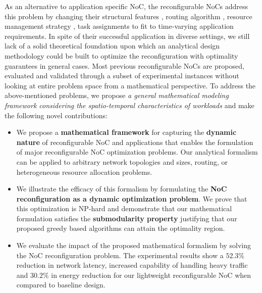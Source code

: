 As an alternative to application specific NoC, the reconfigurable NoCs address this problem by changing their structural features \cite{chen2013smart}\cite{jackson2010skip}, routing algorithm \cite{qian2015fsnoc}, resource management strategy \cite{lee2013adaptive}\cite{kobbe2011distrm}, task assignments \cite{singh2013mapping} to fit to time-varying application requirements. In spite of their successful application in diverse settings, we still lack of a solid theoretical foundation upon which an analytical design methodology could be built to optimize the reconfiguration with optimality guarantees in general cases. Most previous reconfigurable NoCs are proposed, evaluated and validated through a subset of experimental instances without looking at entire problem space from a mathematical perspective. 
To address the above-mentioned problems, we propose \textit{a general mathematical modeling framework considering the spatio-temporal characteristics of workloads} and make the following novel contributions:
\begin{itemize}
\item We propose a \textbf{mathematical framework} for capturing the \textbf{dynamic nature} of reconfigurable NoC and applications that enables the formulation of major reconfigurable NoC optimization problems. Our analytical formalism can be applied to arbitrary network topologies and sizes, routing, or heterogeneous resource allocation problems.
\item We illustrate the efficacy of this formalism by formulating the \textbf{NoC reconfiguration as a dynamic optimization problem}. We prove that this optimization is NP-hard and demonstrate that our mathematical formulation satisfies the \textbf{submodularity property} justifying that our proposed greedy based algorithms can attain the optimality region.
\item We evaluate the impact of the proposed mathematical formalism by solving the NoC reconfiguration problem. The experimental results show a $52.3\%$ reduction in network latency, increased capability of handling heavy traffic and $30.2\%$ in energy reduction for our lightweight reconfigurable NoC when compared to baseline design.
\end{itemize}

